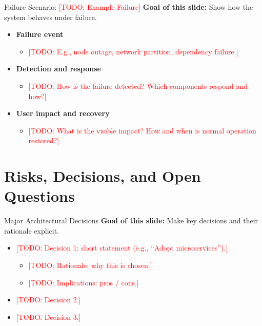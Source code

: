 \documentclass[aspectratio=169]{beamer}
\newcommand{\TODO}[1]{\textcolor{red}{[TODO: #1]}}
\begin{document}
\begin{frame}{Failure Scenario: \TODO{Example Failure}}
  \textbf{Goal of this slide:} Show how the system behaves under failure.

  \begin{itemize}
    \item \textbf{Failure event}
      \begin{itemize}
        \item \TODO{E.g., node outage, network partition, dependency failure.}
      \end{itemize}
    \item \textbf{Detection and response}
      \begin{itemize}
        \item \TODO{How is the failure detected? Which components respond and how?}
      \end{itemize}
    \item \textbf{User impact and recovery}
      \begin{itemize}
        \item \TODO{What is the visible impact? How and when is normal operation restored?}
      \end{itemize}
  \end{itemize}
\end{frame}

\section{Risks, Decisions, and Open Questions}

\begin{frame}{Major Architectural Decisions}
  \textbf{Goal of this slide:} Make key decisions and their rationale explicit.

  \begin{itemize}
    \item \TODO{Decision 1: short statement (e.g., “Adopt microservices”).}
      \begin{itemize}
        \item \TODO{Rationale: why this is chosen.}
        \item \TODO{Implications: pros / cons.}
      \end{itemize}
    \item \TODO{Decision 2.}
    \item \TODO{Decision 3.}
  \end{itemize}
\end{frame}
\end{document}
